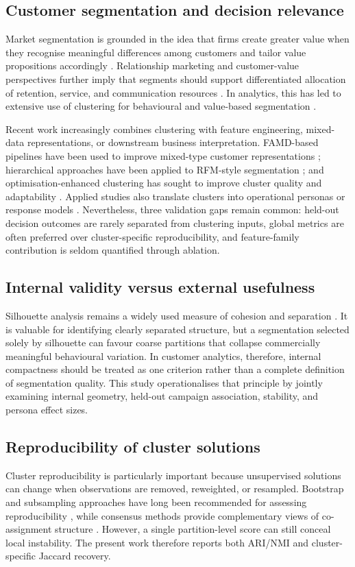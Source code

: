 \documentclass[10pt]{article}
\begin{document}
\subsection{Customer segmentation and decision relevance}
Market segmentation is grounded in the idea that firms create greater value when they recognise meaningful differences among customers and tailor value propositions accordingly \cite{ref6,ref7}. Relationship marketing and customer-value perspectives further imply that segments should support differentiated allocation of retention, service, and communication resources \cite{ref8}. In analytics, this has led to extensive use of clustering for behavioural and value-based segmentation \cite{ref12,ref14,ref16}.

Recent work increasingly combines clustering with feature engineering, mixed-data representations, or downstream business interpretation. FAMD-based pipelines have been used to improve mixed-type customer representations \cite{ref15}; hierarchical approaches have been applied to RFM-style segmentation \cite{ref17}; and optimisation-enhanced clustering has sought to improve cluster quality and adaptability \cite{ref18}. Applied studies also translate clusters into operational personas or response models \cite{ref13,ref19,ref24}. Nevertheless, three validation gaps remain common: held-out decision outcomes are rarely separated from clustering inputs, global metrics are often preferred over cluster-specific reproducibility, and feature-family contribution is seldom quantified through ablation.

\subsection{Internal validity versus external usefulness}
Silhouette analysis remains a widely used measure of cohesion and separation \cite{ref30}. It is valuable for identifying clearly separated structure, but a segmentation selected solely by silhouette can favour coarse partitions that collapse commercially meaningful behavioural variation. In customer analytics, therefore, internal compactness should be treated as one criterion rather than a complete definition of segmentation quality. This study operationalises that principle by jointly examining internal geometry, held-out campaign association, stability, and persona effect sizes.

\subsection{Reproducibility of cluster solutions}
Cluster reproducibility is particularly important because unsupervised solutions can change when observations are removed, reweighted, or resampled. Bootstrap and subsampling approaches have long been recommended for assessing reproducibility \cite{ref2}, while consensus methods provide complementary views of co-assignment structure \cite{ref29}. However, a single partition-level score can still conceal local instability. The present work therefore reports both ARI/NMI and cluster-specific Jaccard recovery.
\end{document}

